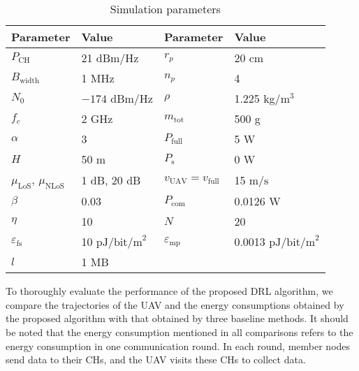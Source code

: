 \documentclass[journal]{IEEEtran}
\begin{document}
\begin{table}[t!]
	\centering
	\caption{Simulation parameters}
	\label{parameters}
	\scriptsize
	 \begin{tabular}{p{1.3cm}<{\centering}|p{2.2cm}<{\centering}||p{1.3cm}<{\centering}|p{2.3cm}<{\centering}}
		\hline{}
		\textbf{Parameter} & \textbf{Value} & \textbf{Parameter} & \textbf{Value}\\
		\hline\hline
		$P_{\text{CH}}$ & 21 $\text{dBm/Hz}$ {\cite{M. B. Ghorbel}} & $r_p$ & 20 cm {\cite{H. Ghazzai}}\\
		\hline
        $B_{\text{width}}$ & 1 MHz {} & $n_p$ & 4 {\cite{H. Ghazzai}}\\
        \hline
        $N_0$ & $-174$ dBm/Hz {\cite{M. B. Ghorbel}} & $\rho$ & 1.225 kg/$\text{m}^3$ {\cite{H. Ghazzai}}\\
        \hline
        $f_c$ & 2 GHz {\cite{M. B. Ghorbel}} & $m_{\text{tot}}$ & 500 g {\cite{H. Ghazzai}}\\
        \hline
        $\alpha$ & 3  {\cite{M. B. Ghorbel}} & $P_{\text{full}}$  & 5 W {\cite{H. Ghazzai}}\\
        \hline
        $H$ & 50 m  & $P_{\text{s}}$ & 0 W {\cite{H. Ghazzai}}\\
        \hline
        $\mu_{\text{LoS}}$, $\mu_{\text{NLoS}}$ & 1 $\text{dB}$, 20 $\text{dB}$ {\cite{A. Al-Hourani}} &$v_{\text{UAV}}=v_{\text{full}}$ & 15 $\text{m/s}$ {\cite{M. B. Ghorbel}} \\
        \hline
        $\beta$ &  0.03  {\cite{M. B. Ghorbel}} & $P_{\text{com}}$ &  0.0126 W {\cite{M. B. Ghorbel}}\\
        \hline
        $\eta$ & 10  {\cite{M. B. Ghorbel}} & $N$ & 20\\
        \hline
        $\varepsilon_\text{fs}$ & {10 $\text{pJ/bit/m}^2$ \cite{W. R. Heinzelman}} & $\varepsilon_\text{mp}$ & {0.0013 $\text{pJ/bit/m}^2$ \cite{W. R. Heinzelman}}\\
        \hline
        {$l$} & {1 MB} &  & \\
        \hline
		\end{tabular}
\end{table}


To thoroughly evaluate the performance of the proposed DRL algorithm, we compare the trajectories of the UAV and the energy consumptions obtained by the proposed algorithm with that obtained by three baseline methods. It should be noted that the energy consumption mentioned in all comparisons refers to the energy consumption in one communication round. In each round, member nodes send data to their CHs, and the UAV visits these CHs to collect data.
\end{document}
